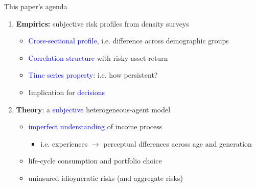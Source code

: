 \documentclass{beamer}
\begin{document}
\begin{frame}{This paper's agenda}
	\begin{enumerate}
		\item \textbf{Empirics:} subjective risk profiles from density surveys
		\begin{itemize}
			\item \textcolor{blue}{Cross-sectional profile}, i.e. difference across demographic groups 
			\item \textcolor{blue}{Correlation structure} with risky asset return
			\item \textcolor{blue}{Time series property}: i.e. how persistent?
			\item Implication for \textcolor{blue}{decisions}
		\end{itemize}
		\item \textbf{Theory}: a \textcolor{blue}{subjective} heterogeneous-agent model 
		\begin{itemize}
			\item  \textcolor{blue}{imperfect understanding} of income process
			\begin{itemize}
				\item i.e. experiences $\rightarrow$ perceptual dfferences across age and generation 
			\end{itemize}
			\item life-cycle consumption and portfolio choice 
			\item uninsured idioyncratic risks (and aggregate risks)
		\end{itemize} 
	\end{enumerate}
\end{frame}
\end{document}
